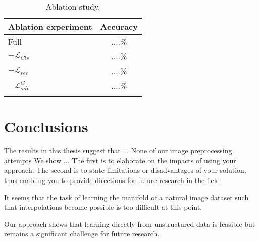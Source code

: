 \documentclass[12pt,a4paper]{article}
\begin{document}
\begin{table}[ht!]
\centering
\begin{tabular}{l c}
\Xhline{0.8pt}
\textbf{Ablation experiment} & \textbf{Accuracy} \\
\hline
Full & ....\% \\
$-\mathcal{L}_{Cls}$ & ....\% \\
$-\mathcal{L}_{rec}$ & ....\% \\
$-\mathcal{L}^G_{adv}$ & ....\% \\
\Xhline{0.8pt}
\end{tabular}
\caption{Ablation study.} \label{tab:ablation}
\end{table}





\section{Conclusions}\label{sec:conclusion}

The results in this thesis suggest that ...
None of our image preprocessing attempts
We show ...
The first is
to elaborate on the impacts of using your approach. The
second is to state limitations or disadvantages of your solution,
thus enabling you to provide directions for future
research in the field.

\par It seems that the task of learning the manifold of a natural image dataset such that interpolations become possible is too difficult at this point.

\par Our approach shows that learning directly from unstructured data is feasible but remains a significant challenge for future research.
\end{document}
